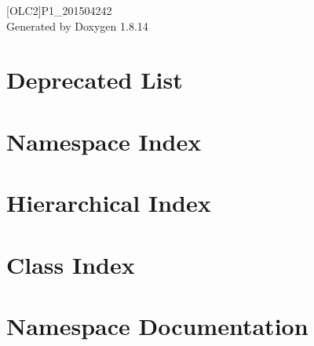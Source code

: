 \documentclass[twoside]{book}
\newcommand{\+}{\discretionary{\mbox{\scriptsize$\hookleftarrow$}}{}{}}
\newcommand{\clearemptydoublepage}{%
  \newpage{\pagestyle{empty}\cleardoublepage}%
}
\begin{document}
\hypersetup{pageanchor=false,
             bookmarksnumbered=true,
             pdfencoding=unicode
            }
\begin{titlepage}
\vspace*{7cm}
\begin{center}%
{\Large \mbox{[}O\+L\+C2\mbox{]}P1\+\_\+201504242 }\\
\vspace*{1cm}
{\large Generated by Doxygen 1.8.14}\\
\end{center}
\end{titlepage}
\clearemptydoublepage
{}
\tableofcontents
\clearemptydoublepage
{}
\hypersetup{pageanchor=true}

\chapter{Deprecated List}
\label{deprecated}

\chapter{Namespace Index}

\chapter{Hierarchical Index}

\chapter{Class Index}

\chapter{Namespace Documentation}

\end{document}
